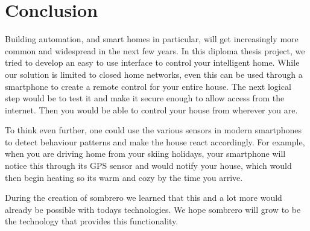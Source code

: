 \chapter{Conclusion}

Building automation, and smart homes in particular, will get increasingly more common and widespread in the next few years. In this diploma thesis project, we tried to develop an easy to use interface to control your intelligent home. While our solution is limited to closed home networks, even this can be used through a smartphone to create a remote control for your entire house. The next logical step would be to test it and make it secure enough to allow access from the internet. Then you would be able to control your house from wherever you are.

To think even further, one could use the various sensors in modern smartphones to detect behaviour patterns and make the house react accordingly. For example, when you are driving home from your skiing holidays, your smartphone will notice this through its GPS sensor and would notify your house, which would then begin heating so its warm and cozy by the time you arrive.

During the creation of sombrero we learned that this and a lot more would already be possible with todays technologies. We hope sombrero will grow to be the technology that provides this functionality.
